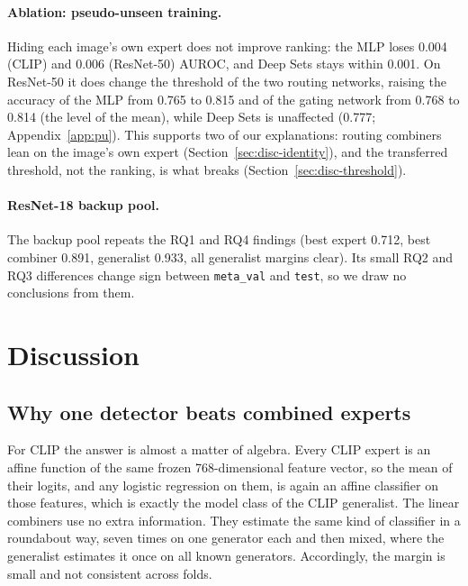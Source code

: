 \documentclass[10pt,a4paper]{article}
\begin{document}
\paragraph{Ablation: pseudo-unseen training.}
Hiding each image's own expert does not improve ranking: the MLP loses 0.004 (CLIP) and 0.006 (ResNet-50) AUROC, and Deep Sets stays within 0.001. On ResNet-50 it does change the threshold of the two routing networks, raising the accuracy of the MLP from 0.765 to 0.815 and of the gating network from 0.768 to 0.814 (the level of the mean), while Deep Sets is unaffected (0.777; Appendix~\ref{app:pu}). This supports two of our explanations: routing combiners lean on the image's own expert (Section~\ref{sec:disc-identity}), and the transferred threshold, not the ranking, is what breaks (Section~\ref{sec:disc-threshold}).

\paragraph{ResNet-18 backup pool.}
The backup pool repeats the RQ1 and RQ4 findings (best expert 0.712, best combiner 0.891, generalist 0.933, all generalist margins clear). Its small RQ2 and RQ3 differences change sign between \texttt{meta\_val} and \texttt{test}, so we draw no conclusions from them.

\section{Discussion}\label{sec:discussion}

\subsection{Why one detector beats combined experts}\label{sec:disc-generalist}

For CLIP the answer is almost a matter of algebra. Every CLIP expert is an affine function of the same frozen 768-dimensional feature vector, so the mean of their logits, and any logistic regression on them, is again an affine classifier on those features, which is exactly the model class of the CLIP generalist. The linear combiners use no extra information. They estimate the same kind of classifier in a roundabout way, seven times on one generator each and then mixed, where the generalist estimates it once on all known generators. Accordingly, the margin is small and not consistent across folds.
\end{document}
